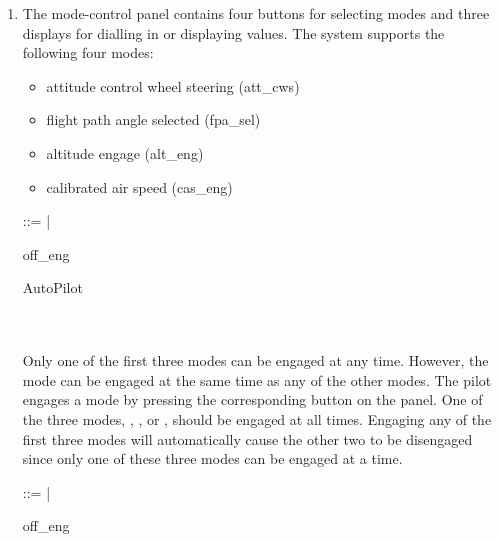 \documentclass{article}
\begin{document}
\begin{enumerate}
\item The mode-control panel contains four buttons for selecting modes and three displays for
dialling in or displaying values. The system supports the following four modes:

\begin{itemize}
\item attitude control wheel steering (att\_cws)
\item flight path angle selected (fpa\_sel)
\item altitude engage (alt\_eng)
\item calibrated air speed (cas\_eng)
\end{itemize}

\begin{zed}
 ::=  | 
\end{zed}

\begin{schema}{off\_eng}
\where
{}
\end{schema}


\begin{schema}{AutoPilot}
 \\
 \\
 \\
\end{schema}

Only one of the first three modes can be engaged at any time. However, the  mode
can be engaged at the same time as any of the other modes. The pilot engages a mode by pressing
the corresponding button on the panel. One of the three modes, , , or ,
should be engaged at all times. Engaging any of the first three modes will automatically cause the
other two to be disengaged since only one of these three modes can be engaged at a time.

\begin{zed}
 ::=  | 
\end{zed}

\begin{schema}{off\_eng}
\where
{}
\end{schema}



\end{enumerate}
\end{document}

